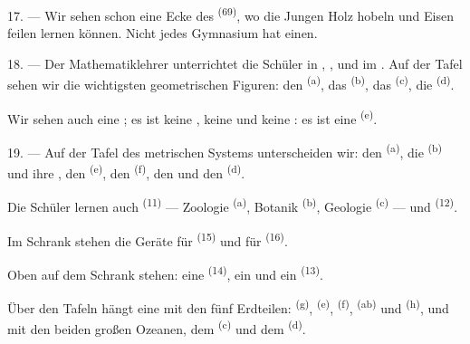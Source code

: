 17. --- Wir sehen schon eine Ecke des 
\textsuperscript{(69)}, wo die Jungen Holz hobeln und Eisen feilen lernen können.
Nicht jedes Gymnasium hat einen.

\VUsaut{5.0mm}
\VUsaut{3.6mm}

18. --- Der Mathematiklehrer unterrichtet die Schüler in ,
,  und im . Auf der
Tafel sehen wir die wichtigsten geometrischen Figuren: den 
\textsuperscript{(a)}, das  \textsuperscript{(b)}, das
 \textsuperscript{(c)}, die  \textsuperscript{(d)}.

Wir sehen auch eine ; es ist keine , keine
 und keine : es ist eine
 \textsuperscript{(e)}.

19. --- Auf der Tafel des metrischen Systems unterscheiden wir: den
 \textsuperscript{(a)}, die  \textsuperscript{(b)} und ihre
, den  \textsuperscript{(e)}, den 
\textsuperscript{(f)}, den  und den 
\textsuperscript{(d)}.

Die Schüler lernen auch  \textsuperscript{(11)} --- Zoologie
\textsuperscript{(a)}, Botanik \textsuperscript{(b)}, Geologie \textsuperscript{(c)}
--- und  \textsuperscript{(12)}.

Im Schrank stehen die Geräte für  \textsuperscript{(15)} und für
 \textsuperscript{(16)}.

Oben auf dem Schrank stehen: eine  \textsuperscript{(14)}, ein
 und ein  \textsuperscript{(13)}.

Über den Tafeln hängt eine  mit den fünf Erdteilen:
 \textsuperscript{(g)},  \textsuperscript{(e)},
 \textsuperscript{(f)},  \textsuperscript{(ab)} und
 \textsuperscript{(h)}, und mit den beiden großen Ozeanen, dem
 \textsuperscript{(c)} und dem  \textsuperscript{(d)}.
\VUsaut{6.0mm}
\VUfilet{22mm}
